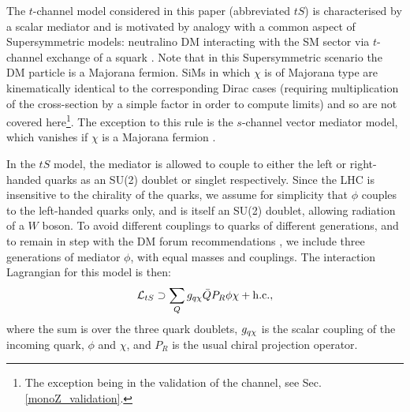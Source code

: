 
The $t$-channel model considered in this paper (abbreviated $tS$) is characterised by a scalar mediator and is motivated by analogy with a common aspect of Supersymmetric models: neutralino DM interacting with the SM sector via $t$-channel exchange of a squark \cite{SUSYDM}. Note that in this Supersymmetric scenario the DM particle is a Majorana fermion. SiMs in which $\chi$ is of Majorana type are kinematically identical to the corresponding Dirac cases (requiring multiplication of the cross-section by a simple factor in order to compute limits) and so are not covered here\footnote{The exception being in the validation of the \monoZ channel, see Sec. \ref{monoZ_validation}.}. The exception to this rule is the $s$-channel vector mediator model, which vanishes if $\chi$ is a Majorana fermion \cite{METSig}.

In the $tS$ model, the mediator is allowed to couple to either the left or right-handed quarks as an SU(2) doublet or singlet respectively. Since the LHC is insensitive to the chirality of the quarks, we assume for simplicity that $\phi$ couples to the left-handed quarks only, and is itself an SU(2) doublet, allowing radiation of a $W$ boson. To avoid different couplings to quarks of different generations, and to remain in step with the DM forum recommendations \cite{}, we include three generations of mediator $\phi$, with equal masses and couplings. The interaction Lagrangian for this model is then:
\begin{equation}
\label{L_int_tS}
\mathcal{L}_{tS} \supset \sum_{Q} g_{q \chi} \bar{Q} P_R \phi \chi + {\rm h.c.},
\end{equation}
where the sum is over the three quark doublets, $g_{q \chi}$ is the scalar coupling of the incoming quark, $\phi$ and $\chi$, and $P_R$ is the usual chiral projection operator.


